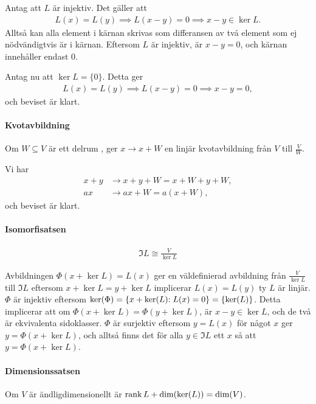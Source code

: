 \proof
Antag att $L$ är injektiv. Det gäller att
\begin{align*}
	L(x) = L(y)\implies L(x - y) = 0\implies x - y\in\ker{L}.
\end{align*}
Alltså kan alla element i kärnan skrivas som differansen av två element som ej nödvändigtvis är i kärnan. Eftersom $L$ är injektiv, är $x - y = 0$, och kärnan innehåller endast $0$.

Antag nu att $\ker{L} = \{0\}$. Detta ger
\begin{align*}
	L(x) = L(y) \implies L(x - y) = 0 \implies x - y = 0,
\end{align*}
och beviset är klart.

\paragraph{Kvotavbildning}
Om $W\subseteq V$ är ett delrum , ger $x\to x + W$ en linjär kvotavbildning från $V$ till $\frac{V}{W}$.

\proof
Vi har
\begin{align*}
	x + y &\to x + y + W = x + W + y + W, \\
	ax    &\to ax + W = a(x + W),
\end{align*}
och beviset är klart.

\paragraph{Isomorfisatsen}
\begin{align*}
	\Im{L} \cong \frac{V}{\ker{L}}
\end{align*}

\proof
Avbildningen $\Phi(x + \ker{L}) = L(x)$ ger en väldefinierad avbildning från $\frac{V}{\ker{L}}$ till $\Im{L}$ eftersom $x + \ker{L} = y + \ker{L}$ implicerar $L(x) = L(y)$ ty $L$ är linjär. $\Phi$ är injektiv eftersom $\ker{\Phi} = \set{x + \ker{L}}{L(x) = 0} = \set{\ker{L}}{}$. Detta implicerar att om $\Phi(x + \ker{L}) = \Phi(y + \ker{L})$, är $x - y\in\ker{L}$, och de två är ekvivalenta sidoklasser. $\Phi$ är surjektiv eftersom $y = L(x)$ för något $x$ ger $y = \Phi(x + \ker{L})$, och alltså finns det för alla $y\in\Im{L}$ ett $x$ så att $y = \Phi(x + \ker{L})$.

\paragraph{Dimensionssatsen}
Om $V$ är ändligdimensionellt är $\rank{L} + \text{dim}(\text{ker}(L)) = \text{dim}(V)$.

